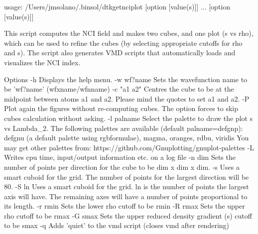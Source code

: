 
    usage: /Users/jmsolano/.binsol/dtkgetnciplot [option [value(s)]] ... [option [value(s)]]

This script computes the NCI field and makes two cubes, and one plot
(s vs rho), which can be used to refine the cubes (by selecting
appropriate cutoffs for rho and s). The script also generates
VMD scripts that automatically loads and visualizes the 
NCI index.

Options 
  -h           Displays the help menu.
  -w wf?name   Sets the wavefunction name to be 'wf?name' (wfxname/wfnname)
  -c "a1 a2"     Centres the cube to be at the midpoint between atoms a1 and
                 a2. Please mind the quotes to set a1 and a2.
  -P           Plot again the figures without re-computing cubes.
                 The option forces to skip cubes calculation without asking.
  -l palname   Select the palette to draw the plot s vs Lambda_2. The
                 following palettes are available (default palname=defgnp):
                   defgnu (a default palette using rgbformulae), magma,
                   oranges, rdbu, viridis
                   You may get other palettes from:
                      https://github.com/Gnuplotting/gnuplot-palettes
  -L        	Writes cpu time, input/output information etc. on a log file
  -n  dim   	Sets the number of points per direction for the cube
            	  to be dim x dim x dim.
  -s        	Uses a smart cuboid for the grid. The number of points for the
            	  largest direction will be 80.
  -S ln     	Uses a smart cuboid for the grid. ln is the number of points
            	  the largest axis will have. The remaining axes will have
            	  a number of points proportional to its length.
  -r rmin      Sets the lower rho cutoff to be rmin
  -R rmax      Sets the upper rho cutoff to be rmax
  -G smax      Sets the upper reduced density gradient (s) cutoff to be smax
  -q           Adds 'quiet' to the vmd script (closes vmd after rendering)


